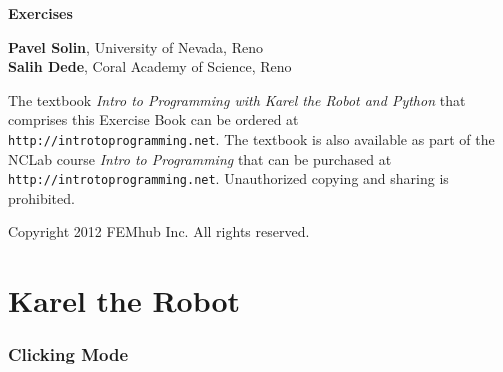 \documentclass[article,A4,12pt]{llncs}
\newif\iffullversion
\begin{document}
\begin{center}
\vspace{2.8cm}
{\huge \bf Exercises}
\end{center}
\vbox{}
\begin{center}
\iffullversion
\else
\vspace{2mm}
\centerline{\huge \color{red}{PREVIEW}}
\fi
\vfill
{\large
{\bf Pavel Solin}, University of Nevada, Reno\\
{\bf Salih Dede}, Coral Academy of Science, Reno
}
\end{center}
\newpage
\vbox{}
\vfill
\begin{center}
{
The textbook {\em Intro to Programming with Karel the Robot and Python} that 
comprises this Exercise Book
can be ordered at {\tt http://introtoprogramming.net}. The textbook 
is also available as part of the NCLab course {\em Intro to Programming} 
that can be purchased at {\tt http://introtoprogramming.net}.
Unauthorized copying and sharing is prohibited.
}
\vfill

Copyright 2012 FEMhub Inc. All rights reserved.
\end{center}




\section*{}
\small

\normalsize

\newpage
\setcounter{tocdepth}{2}
\tableofcontents

\newpage

\pagestyle{plain}
\setcounter{page}{1}


\part{Karel the Robot}

\setcounter{section}{2}
\section{Clicking Mode}

\subsection{}
\end{document}
